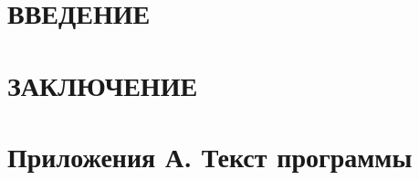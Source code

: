 \documentclass[
    a4paper,
    14pt,
    twoside,
]{extarticle}
\begin{document}

\setcounter{page}{2}

\tableofcontents

\newpage
\section*{\MakeUppercase{Введение}}\label{sec:introduction}



\newpage


\newpage
\section*{\MakeUppercase{Заключение}}\label{sec:conclusion}


\newpage
\section*{Приложения А. Текст программы}



\end{document}
